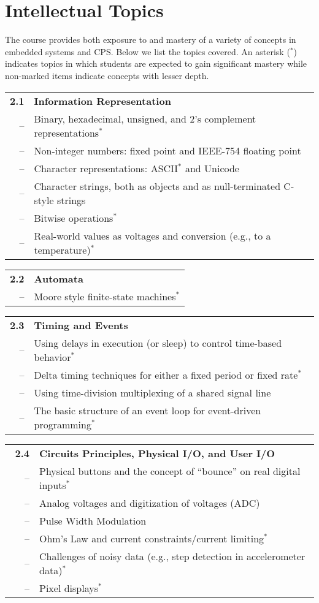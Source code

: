\section{Intellectual Topics}\label{sec:topics}
The course provides both exposure to and mastery of a variety of concepts
in embedded systems and CPS.  Below we list the topics covered.
An asterisk ($^*$) indicates topics in which students are expected to gain significant mastery
while non-marked items indicate concepts with lesser depth.



\noindent
\begin{tabular}{r l}
{\bf 2.1} & {\bf Information Representation} \\
-- & Binary, hexadecimal, unsigned, and 2's complement representations$^*$ \\
-- & Non-integer numbers: fixed point and IEEE-754 floating point \\
-- & Character representations: ASCII$^*$ and Unicode \\
-- & Character strings, both as objects and as null-terminated C-style strings \\
-- &  Bitwise operations$^*$ \\
-- & Real-world values as voltages and conversion (e.g., to a temperature)$^*$
\end{tabular}

\noindent
\begin{tabular}{r l}
{\bf 2.2} & {\bf Automata}\\
-- & Moore style finite-state machines$^*$
\end{tabular}

\noindent
\begin{tabular}{r l}
{\bf 2.3} & {\bf Timing and Events} \\
-- & Using delays in execution (or sleep) to control time-based behavior$^*$ \\
-- & Delta timing techniques for either a fixed period or fixed rate$^*$ \\
-- & Using time-division multiplexing of a shared signal line \\
-- & The basic structure of an event loop for event-driven programming$^*$
\end{tabular}

\noindent
\begin{tabular}{r l}
{\bf 2.4} & {\bf Circuits Principles, Physical I/O, and User I/O} \\
-- & Physical buttons and the concept of ``bounce'' on real digital inputs$^*$ \\
-- & Analog voltages and digitization of voltages (ADC) \\
-- & Pulse Width Modulation \\
-- & Ohm's Law and current constraints/current limiting$^*$ \\
\ \ \ -- & Challenges of noisy data (e.g., step detection in accelerometer data)$^*$ \\
-- & Pixel displays$^*$
\end{tabular}

